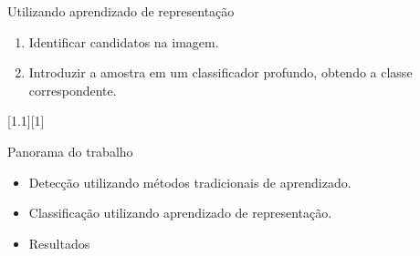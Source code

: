 	\begin{frame}{Utilizando aprendizado de representação}
	\begin{enumerate}
	\item Identificar candidatos na imagem.
	\item Introduzir a amostra em um classificador profundo, obtendo a classe correspondente.
	\end{enumerate}

	[1.1][1]
	\end{frame}

	\begin{frame}{Panorama do trabalho}
		\begin{itemize}
			\item Detecção utilizando métodos tradicionais de aprendizado.
			\item Classificação utilizando aprendizado de representação.
			\item Resultados
		\end{itemize}
	\end{frame}
